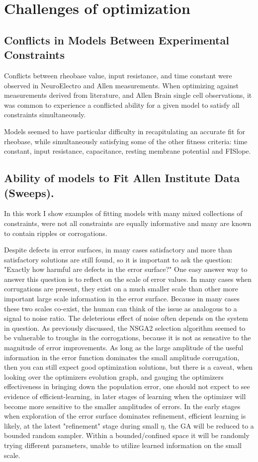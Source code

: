\section{Challenges of optimization}
\subsection{Conflicts in Models Between Experimental Constraints}

Conflicts between rheobase value, input resistance, and time constant  were observed in NeuroElectro and Allen measurements. When optimizing against measurements derived from literature, and Allen Brain single cell observations, it was common to experience a conflicted ability for a given model to satisfy all constraints simultaneously. 

Models seemed to have particular difficulty in recapitulating an accurate fit for rheobase, while simultaneously satisfying some of the other fitness criteria: time constant, input resistance, capacitance, resting membrane potential and FISlope. 


\subsection{Ability of models to Fit Allen Institute Data (Sweeps).}

In this work I show examples of fitting models with many mixed collections of constraints, were not all constraints are equally informative and many are known to contain ripples or corrogations.

Despite defects in error surfaces, in many cases satisfactory and more than satisfactory solutions are still found, so it is important to ask the question: "Exactly how harmful are defects in the error surface?" One easy answer way to answer this question is to reflect on the scale of error values. In many cases when corrugations are present, they exist on a much smaller scale than other more important large scale information in the error surface. Because in many cases these two scales co-exist, the human can think of the issue as analogous to a signal to noise ratio. The deleterious effect of noise often depends on the system in question. As previously discussed, the NSGA2 selection algorithm seemed to be vulnerable to troughs in the corrogations, because it is not as sensative to the magnitude of error improvements. As long as the large amplitude of the useful information in the error function dominates the small amplitude corrugation, then you can still expect good optimization solutions, but there is a caveat, when looking over the optimizers evolution graph, and gauging the optimizers effectiveness in bringing down the population error, one should not expect to see evidence of efficient-learning, in later stages of learning when the optimizer will become more sensitive to the smaller amplitudes of errors. In the early stages when exploration of the error surface dominates refinement, efficient learning is likely, at the latest "refinement" stage during small $\eta$, the GA will be reduced to a bounded random sampler. Within a bounded/confined space it will be randomly trying different parameters, unable to utilize learned information on the small scale.


